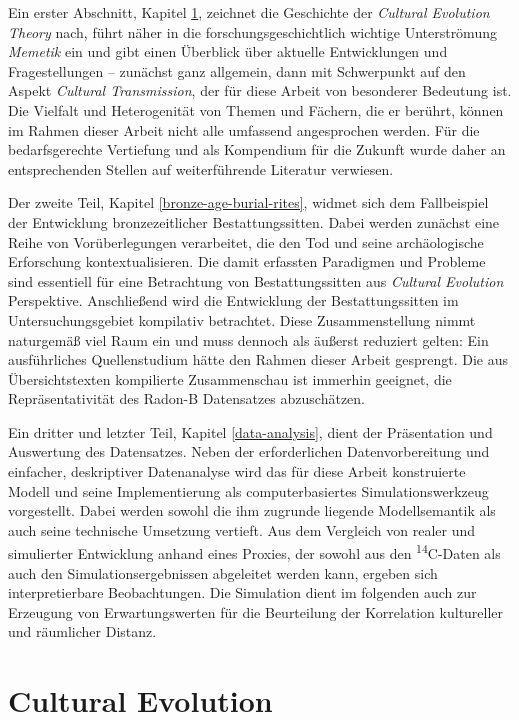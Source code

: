 \documentclass[openany,twoside,twocolumn]{book}
\begin{document}
Ein erster Abschnitt, Kapitel \ref{cultural-evolution}, zeichnet die Geschichte der \emph{Cultural Evolution Theory} nach, führt näher in die forschungsgeschichtlich wichtige Unterströmung \emph{Memetik} ein und gibt einen Überblick über aktuelle Entwicklungen und Fragestellungen -- zunächst ganz allgemein, dann mit Schwerpunkt auf den Aspekt \emph{Cultural Transmission}, der für diese Arbeit von besonderer Bedeutung ist. Die Vielfalt und Heterogenität von Themen und Fächern, die er berührt, können im Rahmen dieser Arbeit nicht alle umfassend angesprochen werden. Für die bedarfsgerechte Vertiefung und als Kompendium für die Zukunft wurde daher an entsprechenden Stellen auf weiterführende Literatur verwiesen.

Der zweite Teil, Kapitel \ref{bronze-age-burial-rites}, widmet sich dem Fallbeispiel der Entwicklung bronzezeitlicher Bestattungssitten. Dabei werden zunächst eine Reihe von Vorüberlegungen verarbeitet, die den Tod und seine archäologische Erforschung kontextualisieren. Die damit erfassten Paradigmen und Probleme sind essentiell für eine Betrachtung von Bestattungssitten aus \emph{Cultural Evolution} Perspektive. Anschließend wird die Entwicklung der Bestattungssitten im Untersuchungsgebiet kompilativ betrachtet. Diese Zusammenstellung nimmt naturgemäß viel Raum ein und muss dennoch als äußerst reduziert gelten: Ein ausführliches Quellenstudium hätte den Rahmen dieser Arbeit gesprengt. Die aus Übersichtstexten kompilierte Zusammenschau ist immerhin geeignet, die Repräsentativität des Radon-B Datensatzes abzuschätzen.

Ein dritter und letzter Teil, Kapitel \ref{data-analysis}, dient der Präsentation und Auswertung des Datensatzes. Neben der erforderlichen Datenvorbereitung und einfacher, deskriptiver Datenanalyse wird das für diese Arbeit konstruierte Modell und seine Implementierung als computerbasiertes Simulationswerkzeug vorgestellt. Dabei werden sowohl die ihm zugrunde liegende Modellsemantik als auch seine technische Umsetzung vertieft. Aus dem Vergleich von realer und simulierter Entwicklung anhand eines Proxies, der sowohl aus den \textsuperscript{14}C-Daten als auch den Simulationsergebnissen abgeleitet werden kann, ergeben sich interpretierbare Beobachtungen. Die Simulation dient im folgenden auch zur Erzeugung von Erwartungswerten für die Beurteilung der Korrelation kultureller und räumlicher Distanz.

\hypertarget{cultural-evolution}{%
\chapter{Cultural Evolution}\label{cultural-evolution}}
\end{document}
